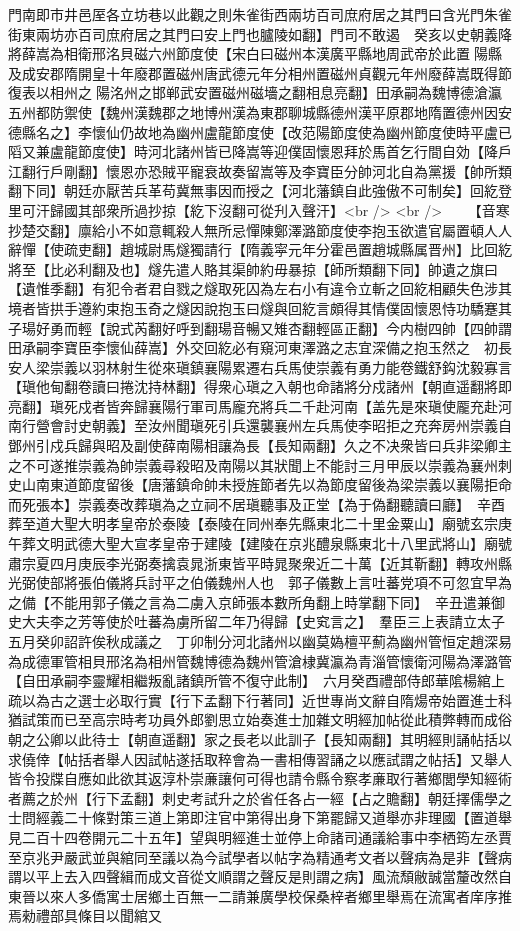 門南即市井邑厔各立坊巷以此觀之則朱雀街西兩坊百司庶府居之其門曰含光門朱雀街東兩坊亦百司庶府居之其門曰安上門也臚陵如翻】門司不敢遏　癸亥以史朝義降將薛嵩為相衛邢洺貝磁六州節度使【宋白曰磁州本漢廣平縣地周武帝於此置陽縣及成安郡隋開皇十年廢郡置磁州唐武德元年分相州置磁州貞觀元年州廢薛嵩既得節復表以相州之陽洺州之邯郸武安置磁州磁墻之翻相息亮翻】田承嗣為魏博德滄瀛五州都防禦使【魏州漢魏郡之地博州漢為東郡聊城縣德州漢平原郡地隋置德州因安德縣名之】李懷仙仍故地為幽州盧龍節度使【改范陽節度使為幽州節度使時平盧已䧟又兼盧龍節度使】時河北諸州皆已降嵩等迎僕固懷恩拜於馬首乞行間自効【降戶江翻行戶剛翻】懷恩亦恐賊平寵衰故奏留嵩等及李寶臣分帥河北自為黨援【帥所類翻下同】朝廷亦厭苦兵革苟冀無事因而授之【河北藩鎮自此強傲不可制矣】回紇登里可汗歸國其部衆所過抄掠【紇下沒翻可從刋入聲汗】<br />
<br />
　　【音寒抄楚交翻】廪給小不如意輒殺人無所忌憚陳鄭澤潞節度使李抱玉欲遣官屬置頓人人辭憚【使疏吏翻】趙城尉馬燧獨請行【隋義寜元年分霍邑置趙城縣属晋州】比回紇將至【比必利翻及也】燧先遣人賂其渠帥約毋暴掠【師所類翻下同】帥遺之旗曰【遺惟季翻】有犯令者君自戮之燧取死囚為左右小有違令立斬之回紇相顧失色涉其境者皆拱手遵約束抱玉奇之燧因說抱玉曰燧與回紇言頗得其情僕固懷恩恃功驕蹇其子瑒好勇而輕【說式芮翻好呼到翻瑒音暢又雉杏翻輕區正翻】今内樹四帥【四帥謂田承嗣李寶臣李懷仙薛嵩】外交回紇必有窺河東澤潞之志宜深備之抱玉然之　初長安人梁崇義以羽林射生從來瑱鎮襄陽累遷右兵馬使崇義有勇力能卷鐵舒鈎沈毅寡言【瑱他甸翻卷讀曰捲沈持林翻】得衆心瑱之入朝也命諸將分戍諸州【朝直遥翻將即亮翻】瑱死戍者皆奔歸襄陽行軍司馬龐充將兵二千赴河南【盖先是來瑱使龎充赴河南行營會討史朝義】至汝州聞瑱死引兵還襲襄州左兵馬使李昭拒之充奔房州崇義自鄧州引戍兵歸與昭及副使薛南陽相讓為長【長知兩翻】久之不决衆皆曰兵非梁卿主之不可遂推崇義為帥崇義尋殺昭及南陽以其狀聞上不能討三月甲辰以崇義為襄州刺史山南東道節度留後【唐藩鎮命帥未授旌節者先以為節度留後為梁崇義以襄陽拒命而死張本】崇義奏改葬瑱為之立祠不居瑱聽事及正堂【為于偽翻聽讀曰廳】　辛酉葬至道大聖大明孝皇帝於泰陵【泰陵在同州奉先縣東北二十里金粟山】廟號玄宗庚午葬文明武德大聖大宣孝皇帝于建陵【建陵在京兆醴泉縣東北十八里武將山】廟號肅宗夏四月庚辰李光弼奏擒袁晁浙東皆平時晁聚衆近二十萬【近其靳翻】轉攻州縣光弼使部將張伯儀將兵討平之伯儀魏州人也　郭子儀數上言吐蕃党項不可忽宜早為之備【不能用郭子儀之言為二虜入京師張本數所角翻上時掌翻下同】　辛丑遣兼御史大夫李之芳等使於吐蕃為虜所留二年乃得歸【史䆒言之】　羣臣三上表請立太子五月癸卯詔許俟秋成議之　丁卯制分河北諸州以幽莫媯檀平薊為幽州管恒定趙深易為成德軍管相貝邢洺為相州管魏博德為魏州管滄棣冀瀛為青淄管懷衛河陽為澤潞管【自田承嗣李靈耀相繼叛亂諸鎮所管不復守此制】　六月癸酉禮部侍郎華隂楊綰上疏以為古之選士必取行實【行下孟翻下行著同】近世專尚文辭自隋煬帝始置進士科猶試策而已至高宗時考功員外郎劉思立始奏進士加雜文明經加帖從此積弊轉而成俗朝之公卿以此待士【朝直遥翻】家之長老以此訓子【長知兩翻】其明經則誦帖括以求僥倖【帖括者舉人因試帖遂括取稡會為一書相傳習誦之以應試謂之帖括】又舉人皆令投牒自應如此欲其返淳朴崇亷讓何可得也請令縣令察孝亷取行著鄉閭學知經術者薦之於州【行下孟翻】刺史考試升之於省任各占一經【占之贍翻】朝廷擇儒學之士問經義二十條對策三道上第即注官中第得出身下第罷歸又道舉亦非理國【置道舉見二百十四卷開元二十五年】望與明經進士並停上命諸司通議給事中李栖筠左丞賈至京兆尹嚴武並與綰同至議以為今試學者以帖字為精通考文者以聲病為是非【聲病謂以平上去入四聲緝而成文音從文順謂之聲反是則謂之病】風流頹敝誠當釐改然自東晉以來人多僑寓士居鄉土百無一二請兼廣學校保桑梓者鄉里舉焉在流寓者庠序推焉勑禮部具條目以聞綰又